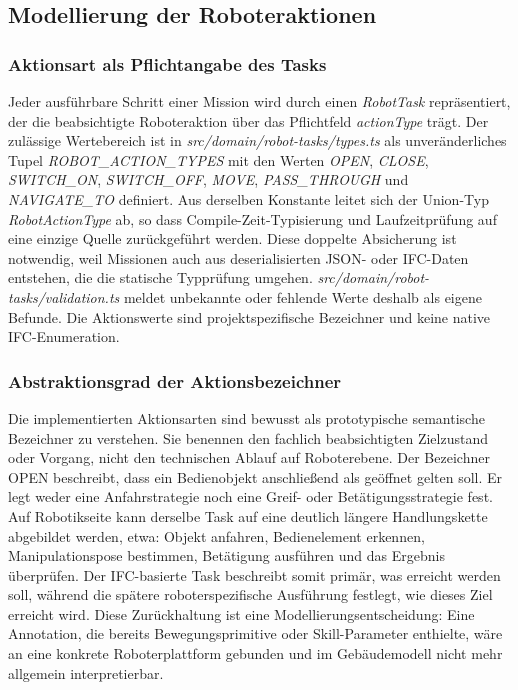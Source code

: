 \subsection{Modellierung der Roboteraktionen}\label{subsec:Modellierung_Roboteraktionen}
\subsubsection{Aktionsart als Pflichtangabe des Tasks}
Jeder ausführbare Schritt einer Mission wird durch einen \textit{RobotTask} repräsentiert, der die
beabsichtigte Roboteraktion über das Pflichtfeld \textit{actionType} trägt. Der zulässige Wertebereich ist in
\textit{src/domain/robot-tasks/types.ts} als unveränderliches Tupel \textit{ROBOT\_ACTION\_TYPES} mit den Werten \textit{OPEN},
\textit{CLOSE}, \textit{SWITCH\_ON}, \textit{SWITCH\_OFF}, \textit{MOVE}, \textit{PASS\_THROUGH} und \textit{NAVIGATE\_TO} definiert. Aus derselben Konstante
leitet sich der Union-Typ \textit{RobotActionType} ab, so dass Compile-Zeit-Typisierung und Laufzeitprüfung
auf eine einzige Quelle zurückgeführt werden. Diese doppelte Absicherung ist notwendig, weil
Missionen auch aus deserialisierten JSON- oder IFC-Daten entstehen, die die statische Typprüfung
umgehen. \textit{src/domain/robot-tasks/validation.ts} meldet unbekannte oder fehlende Werte deshalb als
eigene Befunde. Die Aktionswerte sind projektspezifische Bezeichner und keine native
IFC-Enumeration.
\subsubsection{Abstraktionsgrad der Aktionsbezeichner}
Die implementierten Aktionsarten sind bewusst als prototypische semantische Bezeichner zu verstehen.
Sie benennen den fachlich beabsichtigten Zielzustand oder Vorgang, nicht den technischen Ablauf auf
Roboterebene. Der Bezeichner OPEN beschreibt, dass ein Bedienobjekt anschließend als geöffnet gelten
soll. Er legt weder eine Anfahrstrategie noch eine Greif- oder Betätigungsstrategie fest. Auf
Robotikseite kann derselbe Task auf eine deutlich längere Handlungskette abgebildet werden, etwa:
Objekt anfahren, Bedienelement erkennen, Manipulationspose bestimmen, Betätigung ausführen und das
Ergebnis überprüfen. Der IFC-basierte Task beschreibt somit primär, was erreicht werden soll,
während die spätere roboterspezifische Ausführung festlegt, wie dieses Ziel erreicht wird. Diese
Zurückhaltung ist eine Modellierungsentscheidung: Eine Annotation, die bereits Bewegungsprimitive
oder Skill-Parameter enthielte, wäre an eine konkrete Roboterplattform gebunden und im Gebäudemodell
nicht mehr allgemein interpretierbar.


